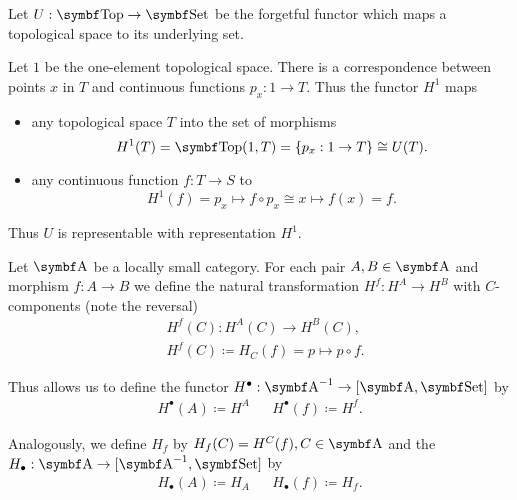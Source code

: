 \begin{example}\label{def:top_representable_functor}\cite[example 4.1.4]{Leinster2014}
  Let \( U: \Cat{Top} \to \Bold{Set} \) be the forgetful functor which maps a topological space to its underlying set.

  Let \( 1 \) be the one-element topological space. There is a correspondence between points \( x \) in \( T \) and continuous functions \( p_x: 1 \to T \). Thus the functor \( H^1 \) maps
  \begin{itemize}
    \item any topological space \( T \) into the set of morphisms
    \begin{equation*}
      H^1(T) = \Cat{Top}(1, T) = \{ p_x: 1 \to T \} \cong U(T).
    \end{equation*}
    \item any continuous function \( f: T \to S \) to
    \begin{equation*}
      H^1(f) = p_x \mapsto f \circ p_x \cong x \mapsto f(x) = f.
    \end{equation*}
  \end{itemize}

  Thus \( U \) is representable with representation \( H^1 \).
\end{example}

\begin{definition}\label{def:yoneda_embedding}\cite[definitions 4.1.15, 4.1.21]{Leinster2014}
  Let \( \Bold A \) be a locally small category. For each pair \( A, B \in \Bold A \) and morphism \( f: A \to B \) we define the natural transformation \( H^f: H^A \to H^B \) with \( C \)-components (note the reversal)
  \begin{align*}
    &H^f(C): H^A(C) \to H^B(C), \\
    &H^f(C) \coloneqq H_C(f) = p \mapsto p \circ f.
  \end{align*}

  Thus allows us to define the functor \( H^\bullet: \Cat{A}^{-1} \to [\Bold{A}, \Bold{Set}] \) by
  \begin{align*}
    H^\bullet(A) \coloneqq H^A && H^\bullet(f) \coloneqq H^f.
  \end{align*}

  Analogously, we define \( H_f \) by \( H_f(C) = H^C(f), C \in \Bold A \) and the  \( H_\bullet: \Cat{A} \to [\Bold{A}^{-1}, \Bold{Set}] \) by
  \begin{align*}
    H_\bullet(A) \coloneqq H_A && H_\bullet(f) \coloneqq H_f.
  \end{align*}
\end{definition}

